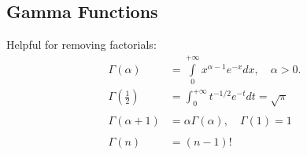 \subsection{Gamma Functions}
Helpful for removing factorials:
\begin{align*}
    \Gamma(\alpha)&=\int\limits_{0}^{+\infty}x^{\alpha-1}e^{-x}dx,\quad\alpha>0. \\
    \Gamma\left(\frac12\right)&=\int_0^{+\infty}t^{-1/2}e^{-t}dt=\sqrt{\pi} \\ \\
    \Gamma(\alpha+1)&=\alpha\Gamma(\alpha),\quad \Gamma(1)=1 \\ \\
    \Gamma(n)&=(n-1)!
\end{align*}
